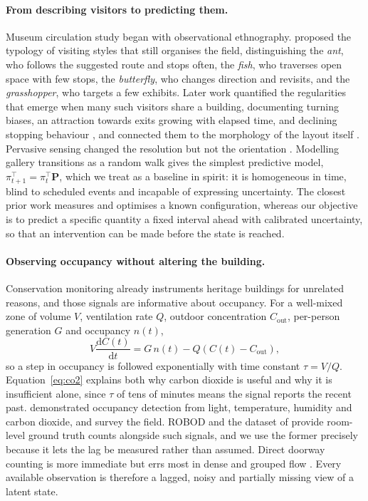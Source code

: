 \documentclass[11pt]{article}
\theoremstyle{plain}
\theoremstyle{definition}
\theoremstyle{remark}
\begin{document}
\paragraph{From describing visitors to predicting them.}
Museum circulation study began with observational ethnography. \citet{veron1983} proposed the typology of visiting styles that still organises the field, distinguishing the \emph{ant}, who follows the suggested route and stops often, the \emph{fish}, who traverses open space with few stops, the \emph{butterfly}, who changes direction and revisits, and the \emph{grasshopper}, who targets a few exhibits. Later work quantified the regularities that emerge when many such visitors share a building, documenting turning biases, an attraction towards exits growing with elapsed time, and declining stopping behaviour \citep{klein1993,bitgood2006}, and connected them to the morphology of the layout itself \citep{choi1999}. Pervasive sensing changed the resolution but not the orientation \citep{kanda2007,yoshimura2014louvre,uwbmuseum2026}. Modelling gallery transitions as a random walk \citep{yoshimura2019randomwalk} gives the simplest predictive model, $\pi_{t+1}^{\top} = \pi_t^{\top}\bm{P}$, which we treat as a baseline in spirit: it is homogeneous in time, blind to scheduled events and incapable of expressing uncertainty. The closest prior work \citep{centorrino2021museums} measures and optimises a known configuration, whereas our objective is to predict a specific quantity a fixed interval ahead with calibrated uncertainty, so that an intervention can be made before the state is reached.

\paragraph{Observing occupancy without altering the building.}
Conservation monitoring already instruments heritage buildings for unrelated reasons, and those signals are informative about occupancy. For a well-mixed zone of volume $V$, ventilation rate $Q$, outdoor concentration $C_{\mathrm{out}}$, per-person generation $G$ and occupancy $n(t)$,
\begin{equation}
V\frac{\mathrm{d}C(t)}{\mathrm{d}t} = G\,n(t) - Q\left(C(t) - C_{\mathrm{out}}\right),
\label{eq:co2}
\end{equation}
so a step in occupancy is followed exponentially with time constant $\tau = V/Q$. Equation~\eqref{eq:co2} explains both why carbon dioxide is useful and why it is insufficient alone, since $\tau$ of tens of minutes means the signal reports the recent past. \citet{candanedo2016} demonstrated occupancy detection from light, temperature, humidity and carbon dioxide, and \citet{chen2018review} survey the field. ROBOD \citep{tekler2022robod} and the dataset of \citet{schwee2019} provide room-level ground truth counts alongside such signals, and we use the former precisely because it lets the lag be measured rather than assumed. Direct doorway counting is more immediate but errs most in dense and grouped flow \citep{brscic2013}. Every available observation is therefore a lagged, noisy and partially missing view of a latent state.
\end{document}
